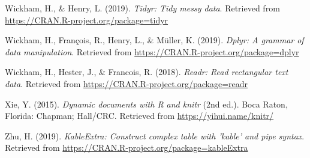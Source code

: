 \documentclass[man, fleqn, noextraspace,floatsintext]{apa6}
\begin{document}
\hypertarget{ref-R-tidyr}{}
Wickham, H., \& Henry, L. (2019). \emph{Tidyr: Tidy messy data}.
Retrieved from \url{https://CRAN.R-project.org/package=tidyr}

\hypertarget{ref-R-dplyr}{}
Wickham, H., François, R., Henry, L., \& Müller, K. (2019). \emph{Dplyr:
A grammar of data manipulation}. Retrieved from
\url{https://CRAN.R-project.org/package=dplyr}

\hypertarget{ref-R-readr}{}
Wickham, H., Hester, J., \& Francois, R. (2018). \emph{Readr: Read
rectangular text data}. Retrieved from
\url{https://CRAN.R-project.org/package=readr}

\hypertarget{ref-R-knitr}{}
Xie, Y. (2015). \emph{Dynamic documents with R and knitr} (2nd ed.).
Boca Raton, Florida: Chapman; Hall/CRC. Retrieved from
\url{https://yihui.name/knitr/}

\hypertarget{ref-R-kableExtra}{}
Zhu, H. (2019). \emph{KableExtra: Construct complex table with 'kable'
and pipe syntax}. Retrieved from
\url{https://CRAN.R-project.org/package=kableExtra}

\endgroup
\end{document}
